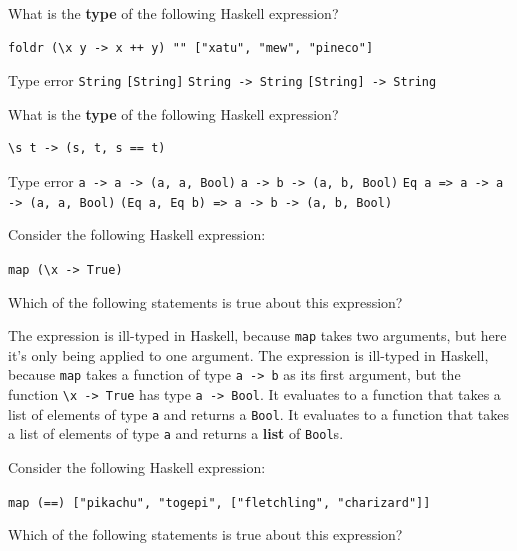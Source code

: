 \documentclass[addpoints]{exam}
\begin{document}
\begin{questions}
\question[3] What is the \textbf{type} of the following Haskell expression?

\begin{verbatim}
foldr (\x y -> x ++ y) "" ["xatu", "mew", "pineco"]
\end{verbatim}

\begin{choices}
  \choice Type error
  \CorrectChoice \verb|String|
  \choice \verb|[String]|
  \choice \verb|String -> String|
  \choice \verb|[String] -> String|
\end{choices}

\newpage

\question[3] What is the \textbf{type} of the following Haskell expression?

\begin{verbatim}
\s t -> (s, t, s == t)
\end{verbatim}

\begin{choices}
  \choice Type error
  \choice \verb|a -> a -> (a, a, Bool)|
  \choice \verb|a -> b -> (a, b, Bool)|
  \CorrectChoice \verb|Eq a => a -> a -> (a, a, Bool)|
  \choice \verb|(Eq a, Eq b) => a -> b -> (a, b, Bool)|
\end{choices}

\question[3] Consider the following Haskell expression:

\verb|map (\x -> True)|

Which of the following statements is true about this expression?

\begin{choices}
  \choice The expression is ill-typed in Haskell, because \verb|map| takes two arguments, but here it's only being applied to one argument.
  \choice The expression is ill-typed in Haskell, because \verb|map| takes a function of type \verb|a -> b| as its first argument, but the function \verb|\x -> True| has type \verb|a -> Bool|.
  \choice It evaluates to a function that takes a list of elements of type \verb|a| and returns a \verb|Bool|.
  \CorrectChoice It evaluates to a function that takes a list of elements of type \verb|a| and returns a \textbf{list} of \verb|Bool|s.
\end{choices}

\question[4] Consider the following Haskell expression:

\verb|map (==) ["pikachu", "togepi", ["fletchling", "charizard"]]|

Which of the following statements is true about this expression?


\end{questions}
\end{document}
